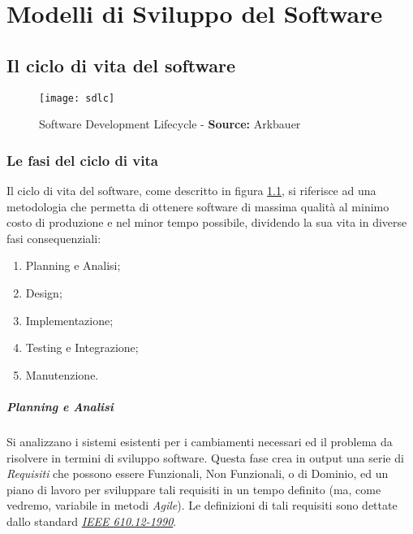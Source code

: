 \documentclass[../main.tex]{subfiles}
\begin{document}
    \chapter{Modelli di Sviluppo del Software}
    	
        \section{Il ciclo di vita del software}
        
        	\begin{figure}[h]
        		\centering
        		\texttt{[image: sdlc]}
        		\caption{Software Development Lifecycle - \textbf{Source:} Arkbauer}
        		\label{fig:sdlc}
        	\end{figure}
        
        	\subsection{Le fasi del ciclo di vita}
        
        		Il ciclo di vita del software\cite{sdlc}, come descritto in figura \ref{fig:sdlc}, si riferisce ad una metodologia che permetta di ottenere software di massima qualità al minimo costo di produzione e nel minor tempo possibile, dividendo la sua vita in diverse fasi consequenziali:
        		\begin{enumerate}
        			\item Planning e Analisi;
        			\item Design;
        			\item Implementazione;
        			\item Testing e Integrazione;
        			\item Manutenzione.
        		\end{enumerate}
        		
        		\paragraph{Planning e Analisi}
        		Si analizzano i sistemi esistenti per i cambiamenti necessari ed il problema da risolvere in termini di sviluppo software.
        		Questa fase crea in output una serie di \emph{Requisiti} che possono essere Funzionali, Non Funzionali, o di Dominio, ed un piano di lavoro per sviluppare tali requisiti in un tempo definito (ma, come vedremo, variabile in metodi \emph{Agile}).
        		Le definizioni di tali requisiti sono dettate dallo standard \href{https://standards.ieee.org/standard/610_12-1990.html}{\emph{IEEE 610.12-1990}}.
        		
\end{document}
